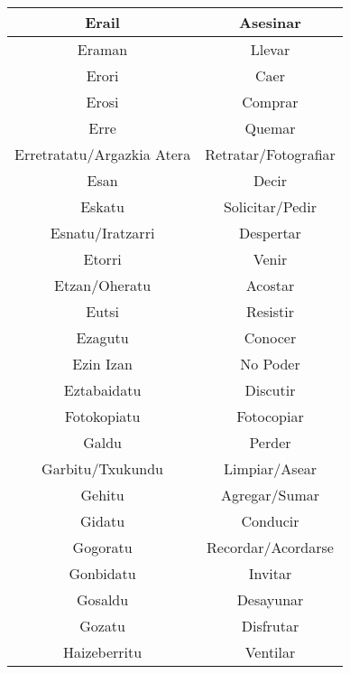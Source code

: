 \documentclass[11pt, a4paper]{article}
\begin{document}
\begin{longtable}{cc}
\hline
Erail                      & Asesinar                    \\ 
\hline
Eraman                     & Llevar                      \\ 
\hline
Erori                      & Caer                        \\ 
\hline
Erosi                      & Comprar                     \\ 
\hline
Erre                       & Quemar                      \\ 
\hline
Erretratatu/Argazkia Atera & Retratar/Fotografiar        \\ 
\hline
Esan                       & Decir                       \\ 
\hline
Eskatu                     & Solicitar/Pedir             \\ 
\hline
Esnatu/Iratzarri           & Despertar                   \\ 
\hline
Etorri                     & Venir                       \\ 
\hline
Etzan/Oheratu              & Acostar                     \\ 
\hline
Eutsi                      & Resistir                    \\ 
\hline
Ezagutu                    & Conocer                     \\ 
\hline
Ezin Izan                  & No Poder                    \\ 
\hline
Eztabaidatu                & Discutir                    \\ 
\hline
Fotokopiatu                & Fotocopiar                  \\ 
\hline
Galdu                      & Perder                      \\ 
\hline
Garbitu/Txukundu           & Limpiar/Asear               \\ 
\hline
Gehitu                     & Agregar/Sumar               \\ 
\hline
Gidatu                     & Conducir                    \\ 
\hline
Gogoratu                   & Recordar/Acordarse          \\ 
\hline
Gonbidatu                  & Invitar                     \\ 
\hline
Gosaldu                    & Desayunar                   \\ 
\hline
Gozatu                     & Disfrutar                   \\ 
\hline
Haizeberritu               & Ventilar                    \\ 

\end{longtable}
\end{document}

